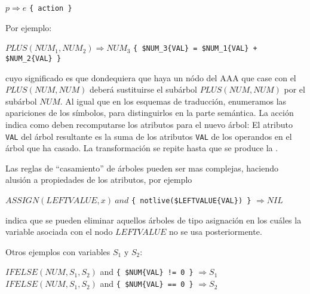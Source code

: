 \begin{center}
$p \Longrightarrow e$  \verb|{ action }|
\end{center}

Por ejemplo:

\vspace{0.25cm}
$PLUS(NUM_1, NUM_2) \Longrightarrow NUM_3$ \verb|{ $NUM_3{VAL} = $NUM_1{VAL} + $NUM_2{VAL} }|
\vspace{0.25cm}

cuyo significado es que dondequiera que haya un nódo del AAA que case 
con el  $PLUS(NUM, NUM)$ deberá sustituirse
el subárbol $PLUS(NUM, NUM)$ por el subárbol $NUM$. Al igual que en los 
esquemas de traducción, enumeramos las apariciones de los símbolos,
para distinguirlos en la parte semántica. La acción indica 
como deben recomputarse los atributos para el nuevo árbol:
El atributo \verb|VAL| del árbol resultante es la suma de los atributos
\verb|VAL| de los operandos en el árbol que ha casado.
La transformación se repite hasta que se produce la .

Las reglas de ``casamiento''  de árboles pueden ser mas complejas, 
haciendo alusión a propiedades de los atributos, por ejemplo

\vspace{0.25cm}
$ASSIGN(LEFTVALUE, x)\ and$ \verb|{ notlive($LEFTVALUE{VAL}) }| $\Longrightarrow NIL$
\vspace{0.25cm}

indica que se pueden eliminar aquellos árboles de tipo asignación
en los cuáles la variable asociada con el nodo $LEFTVALUE$
no se usa posteriormente. 

Otros ejemplos con variables $S_1$ y $S_2$:

\begin{center}
$IFELSE(NUM, S_1, S_2)$ and \verb|{ $NUM{VAL} != 0 }| $\Longrightarrow S_1$\\ 
$IFELSE(NUM, S_1, S_2)$ and \verb|{ $NUM{VAL} == 0 }| $\Longrightarrow S_2$ 
\end{center}


%
%

